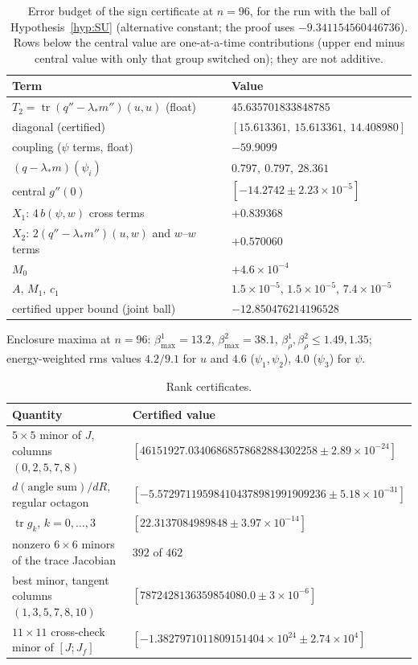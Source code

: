 \documentclass[11pt]{amsart}
\theoremstyle{definition}
\theoremstyle{remark}
\newcommand{\tr}{\operatorname{tr}}
\newcommand{\ls}{\lambda_*}
\begin{document}
\begin{table}[!htbp]
\caption{Error budget of the sign certificate at $n=96$, for the run with the ball of
Hypothesis~\ref{hyp:SU} (alternative constant; the proof uses $-9.341154560446736$). Rows below the central value are
one-at-a-time contributions (upper end minus central value with only that group switched on); they
are not additive.}\label{tab:budget}
\small
\begin{tabular}{@{}ll@{}}
\toprule
Term & Value\\
\midrule
$T_2=\tr(q''-\ls m'')(u,u)$ (float) & $45.635701833848785$ \\
\quad diagonal (certified) & $[15.613361,\ 15.613361,\ 14.408980]$\\
coupling ($\psi$ terms, float) & $-59.9099$\\
\quad $(q-\ls m)(\psi_i)$ & $0.797,\ 0.797,\ 28.361$\\
central $g''(0)$ & $[-14.2742\pm2.23\times10^{-5}]$\\
\midrule
$X_1$: $4\,b(\psi,w)$ cross terms & $+0.839368$\\
$X_2$: $2(q''-\ls m'')(u,w)$ and $w$--$w$ terms & $+0.570060$\\
$M_0$ & $+4.6\times10^{-4}$\\
$A$, $M_1$, $c_1$ & $1.5\times10^{-5}$, $1.5\times10^{-5}$, $7.4\times10^{-5}$\\
\midrule
certified upper bound (joint ball) & $-12.850476214196528$\\
\bottomrule
\end{tabular}

\medskip
\parbox{0.9\textwidth}{\footnotesize Enclosure maxima at $n=96$: $\beta^1_{\max}=13.2$,
$\beta^2_{\max}=38.1$, $\beta^1_\rho,\beta^2_\rho\le1.49,1.35$; energy-weighted rms values $4.2/9.1$ for
$u$ and $4.6$ ($\psi_1,\psi_2$), $4.0$ ($\psi_3$) for $\psi$.}
\end{table}

\begin{table}[!htbp]
\caption{Rank certificates.}\label{tab:rank}
\small
\begin{tabular}{@{}p{}p{}@{}}
\toprule
Quantity & Certified value\\
\midrule
$5\times5$ minor of $J$, columns $(0,2,5,7,8)$ & $[46151927.03406868578682884302258\pm2.89\times10^{-24}]$\\
$d(\text{angle sum})/dR$, regular octagon & $[-5.572971195984104378981991909236\pm5.18\times10^{-31}]$\\
$\tr g_k$, $k=0,\dots,3$ & $[22.3137084989848\pm3.97\times10^{-14}]$\\
nonzero $6\times6$ minors of the trace Jacobian & $392$ of $462$\\
best minor, tangent columns $(1,3,5,7,8,10)$ & $[7872428136359854080.0\pm3\times10^{-6}]$\\
$11\times11$ cross-check minor of $[J;J_f]$ & $[-1.3827971011809151404\times10^{24}\pm2.74\times10^{4}]$\\
\bottomrule
\end{tabular}
\end{table}
\end{document}
